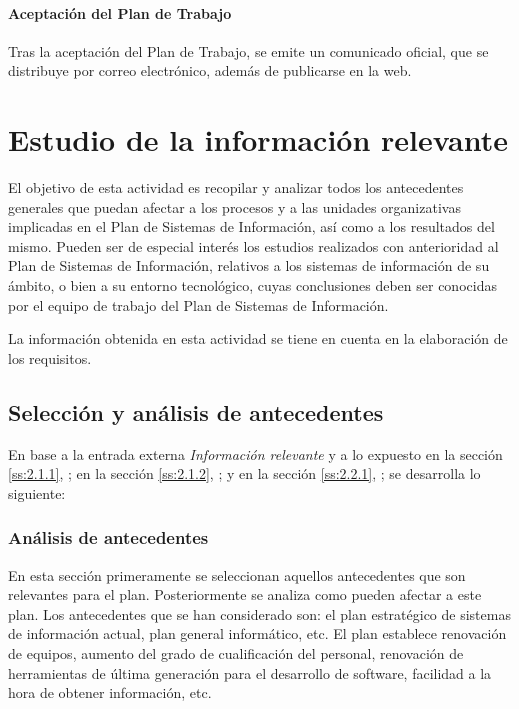 \documentclass[11pt,a4paper,spanish,twoside]{report}
\begin{document}
\subsubsection{Aceptación del Plan de Trabajo}
Tras la aceptación del Plan de Trabajo, se emite un comunicado oficial, que 
se distribuye por correo electrónico, además de publicarse en la web.


\chapter{Estudio de la información relevante}
El objetivo de esta actividad es recopilar y analizar todos los antecedentes
generales que puedan afectar a los procesos y a las unidades organizativas
implicadas en el Plan de Sistemas de Información, así como a los resultados
del mismo. Pueden ser de especial interés los estudios realizados con
anterioridad al Plan de Sistemas de Información, relativos a los sistemas de
información de su ámbito, o bien a su entorno tecnológico, cuyas conclusiones
deben ser conocidas por el equipo de trabajo del Plan de Sistemas de
Información. 

La información obtenida en esta actividad se tiene en cuenta en
la elaboración de los requisitos.

\section{Selección y análisis de antecedentes}
En base a la entrada externa \emph{Información relevante} y a lo expuesto 
en la sección \vref{ss:2.1.1}, \emph{}; 
en la sección \vref{ss:2.1.2}, \emph{}; y
en la sección \vref{ss:2.2.1}, \emph{}; 
se desarrolla lo siguiente:

\subsection{Análisis de antecedentes} \label{ss:3.1.1}
En esta sección primeramente se seleccionan aquellos antecedentes que son
relevantes para el plan. Posteriormente se analiza como pueden
afectar a este plan. Los antecedentes que se han considerado son: el
plan estratégico de sistemas de información actual, plan general
informático, etc. 
El plan establece renovación de equipos, aumento del grado de cualificación
del personal, renovación de herramientas de última generación para el
desarrollo de software, facilidad a la hora de obtener información, etc. 
\end{document}
